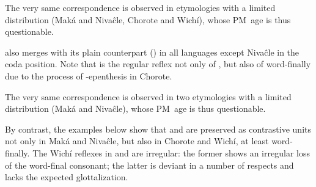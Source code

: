 \begin{exe}
    \ex \honeycomb
    \ex \drinkn
    \ex \son
    \ex \firef
    \ex \cutdown
    \ex \fieldn
    \ex \rootn \label{degl-rootn}
    \ex \hidev
    \ex \leech
    \ex \fart
    \ex \dew
    \ex \wax
    \ex \jaguar
    \ex \water
    \ex \sandisaj
    \ex \tail
    \ex \fall
    \ex \dividev
    \ex \answer
    \ex \sweat
    \ex \oldn
    \ex \wash
    \ex \winter
    \ex \languageword
    \ex \thread
    \ex \yicalhuk
    \ex \powder
    \ex \nose
    \ex \smelln
    \ex \lippaset
    \ex \fence
    \ex \lid
    \ex \starn
    \ex \vein
    \ex \mesh
    \ex \sprout
    \ex \abdcavity
    \ex \suckb \label{pregl-suckb}
    \ex \shoot
    \ex \spinsew \label{degl-tilh}
    \ex \carrysh
    \ex \dig
    \ex \blind
    \ex \uncle
    \ex \duraznillo
    \ex \nest \label{degl-lhup}
    \ex \badmood
    \ex \burrow
    \ex \walk
    \ex \climb
    \ex \night
    \ex \headits
    \ex \spring
    \ex \earth
    \ex \palosanto
    \ex \sandyplace
    \ex \firewoodhuk
    \ex \knee
    \ex \snakeatuj
    \ex \chest
\end{exe}

The very same correspondence is observed in etymologies with a limited distribution (Maká and Nivaĉle, Chorote and Wichí), whose PM~age is thus questionable.

\begin{exe}
    \ex \fry
    \ex \hole
    \ex \leafmn
    \ex \onemn
\end{exe}

 also merges with its plain counterpart () in all languages except Nivaĉle in the coda position. Note that  is the regular reflex not only of , but also of  word-finally due to the process of \mbox{-}epenthesis in Chorote.

\begin{exe}
    \ex \yicaay
    \ex \notafraid
    \ex \sunn
    \ex \withstand
    \ex \bitter
    \ex \blood
\end{exe}

The very same correspondence is observed in two etymologies with a limited distribution (Maká and Nivaĉle), whose PM~age is thus questionable.

\begin{exe}
    \ex \weave
    \ex \soundv
\end{exe}

By contrast, the examples below show that  and  are preserved as contrastive units not only in Maká and Nivaĉle, but also in Chorote and Wichí, at least word-finally. The Wichí reflexes in  and  are irregular: the former shows an irregular loss of the word-final consonant; the latter is deviant in a number of respects and lacks the expected glottalization.

